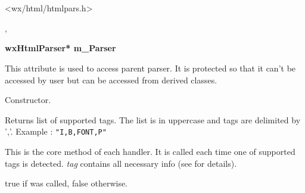 %
%

\section{}\label{wxhtmltaghandler}




<wx/html/htmlpars.h>


,


\label{wxhtmltaghandlermparser}

{\bf wxHtmlParser* m\_Parser}

This attribute is used to access parent parser. It is protected so that
it can't be accessed by user but can be accessed from derived classes.

\label{wxhtmltaghandlerwxhtmltaghandler}


Constructor.

\label{wxhtmltaghandlergetsupportedtags}


Returns list of supported tags. The list is in uppercase and tags
are delimited by ','. Example : {\tt "I,B,FONT,P" }

\label{wxhtmltaghandlerhandletag}


This is the core method of each handler. It is called each time
one of supported tags is detected. {\it tag} contains all necessary
info (see  for details).


true if  was called,
false otherwise.


